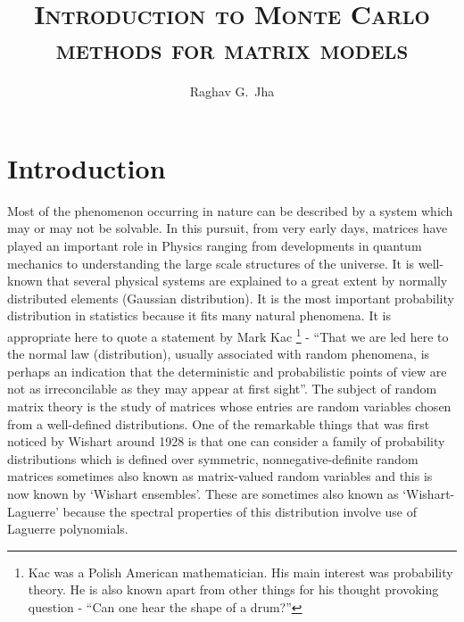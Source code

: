 \documentclass[11pt]{article}
\title{\textsc{Introduction to Monte Carlo methods for matrix models}}
\author[a]{Raghav G.~Jha}
\affiliation{Perimeter Institute for Theoretical Physics, Waterloo, Ontario N2L 2Y5, Canada}
\begin{document}
\date{}
\maketitle

\section{Introduction}

Most of the phenomenon occurring in nature can be described by a system which may or may not be solvable. 
In this pursuit, from very early days, matrices have played an important role in Physics ranging from 
developments in quantum mechanics to understanding the large scale structures of the universe. 
It is well-known that several physical systems are explained to a great extent 
by normally distributed elements (Gaussian distribution). It is the most important probability 
distribution in statistics because it fits many natural phenomena. It is appropriate here to quote a statement by Mark Kac 
\footnote{Kac was a Polish American mathematician. His main interest was probability theory. 
He is also known apart from other things for his thought provoking question - ``Can one hear 
the shape of a drum?''} - ``That we are led here to the normal law (distribution), usually associated with random phenomena, is perhaps
an indication that the deterministic and probabilistic points of view are not as irreconcilable as they may appear at first sight''.
The subject of random matrix theory is the study of matrices whose entries are random 
variables chosen from a well-defined distributions. One of the remarkable things that 
was first noticed by Wishart around 1928 is that one can consider a family of 
probability distributions which is defined over symmetric, nonnegative-definite 
random matrices sometimes also known as matrix-valued random variables 
and this is now known by `Wishart ensembles'. These are sometimes also known 
as `Wishart-Laguerre' because the spectral properties of this distribution 
involve use of Laguerre polynomials. 
\end{document}
